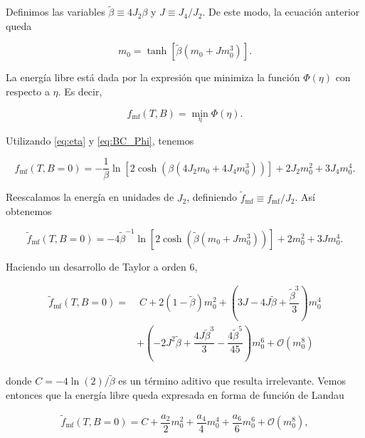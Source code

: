 \documentclass[10pt]{article}
\begin{document}
Definimos las variables $\tilde{\beta} \equiv 4 J_2 \beta$ y $J \equiv J_4/J_2$. De este modo, la ecuaci\'on anterior queda

\begin{equation}
m_0 = \tanh\left[\tilde{\beta} (m_0 + J m_0^3)\right].
\end{equation}

La energ\'ia libre est\'a dada por la expresi\'on que minimiza la funci\'on $\Phi(\eta)$ con respecto a $\eta$. Es decir,

\begin{equation}
f_{\mathrm{mf}}(T,B) = \min_{\eta} \Phi(\eta).
\end{equation}

Utilizando \ref{eq:eta} y \ref{eq:BC_Phi}, tenemos

\begin{equation}
f_{\mathrm{mf}}(T,B=0) = -\dfrac{1}{\beta} \ln \left[2 \cosh\left(\beta ( 4 J_2 m_0 + 4 J_4 m_0^3)\right) \right] +2 J_2 m_0^2 + 3 J_4 m_0^4.
\end{equation}

Reescalamos la energ\'ia en unidades de $J_2$, definiendo $\tilde{f}_{\mathrm{mf}} \equiv f_{\mathrm{mf}}/J_2$. As\'i obtenemos

\begin{equation}
\tilde{f}_{\mathrm{mf}}(T,B=0) = -4\tilde{\beta}^{-1} \ln \left[2 \cosh\left(\tilde{\beta} ( m_0 + J m_0^3)\right) \right] +2 m_0^2 + 3 J m_0^4.
\end{equation}

Haciendo un desarrollo de Taylor a orden 6,

\begin{align}
\tilde{f}_{\mathrm{mf}}(T,B=0) =& \;C + 2(1-\tilde{\beta}) m_0^2 + 
\left(3J - 4J\tilde{\beta} + \dfrac{\tilde{\beta}^3}{3} \right) m_0^4 \nonumber \\
&+ \left(-2 J^2\tilde{\beta} + \dfrac{4J\tilde{\beta}^3}{3} - \dfrac{4\tilde{\beta}^5}{45}\right) m_0^6 + \mathcal{O}(m_0^8)
\end{align}

donde $C = -4\ln(2)/\tilde{\beta}$ es un t\'ermino aditivo que resulta irrelevante. Vemos entonces que la energ\'ia libre queda expresada en forma de funci\'on de Landau

\begin{align}
\tilde{f}_{\mathrm{mf}}(T,B=0) = C + \dfrac{a_2}{2} m_0^2 + 
\dfrac{a_4}{4} m_0^4 + \dfrac{a_6}{6} m_0^6 + \mathcal{O}(m_0^8),
\end{align}
\end{document}
